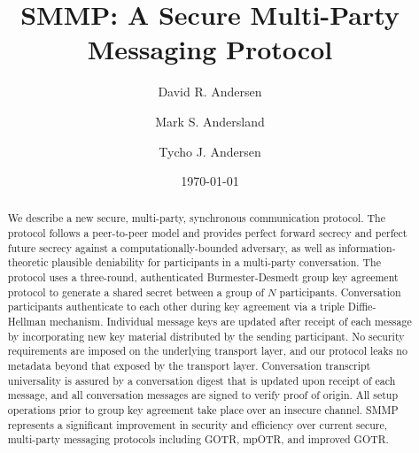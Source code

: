 \documentclass[%
preprint,
amsmath,amssymb,
aps,
prb,
floatfix,
]{revtex4-1}
\begin{document}

\title{SMMP: A Secure Multi-Party Messaging Protocol}%

\author{David R. Andersen}
\author{Mark S. Andersland}
\author{Tycho J. Andersen}

\date{\today}%

\begin{abstract}
We describe a new secure, multi-party, synchronous communication protocol.
The protocol follows a peer-to-peer model and provides perfect forward
secrecy and perfect future secrecy against a computationally-bounded adversary,
as well as information-theoretic plausible deniability for participants in
a multi-party conversation.
The protocol uses a three-round, authenticated Burmester-Desmedt group key agreement
protocol to generate a shared secret between a group of $N$ participants.
Conversation participants authenticate to each other
during key agreement via a triple Diffie-Hellman mechanism.
Individual message keys are updated after receipt of each message by incorporating
new key material distributed by the sending participant.
No security requirements are imposed on the underlying transport layer, and
our protocol leaks no metadata beyond that exposed by the transport layer.
Conversation transcript universality is assured by a conversation digest that is updated
upon receipt of each message, and all conversation messages are signed to
verify proof of origin.
All setup operations prior to group key agreement take place over an insecure
channel.
SMMP represents a significant improvement in security and efficiency over
current secure, multi-party messaging protocols including GOTR, mpOTR, and
improved GOTR.
\end{abstract}

\maketitle
\end{document}
